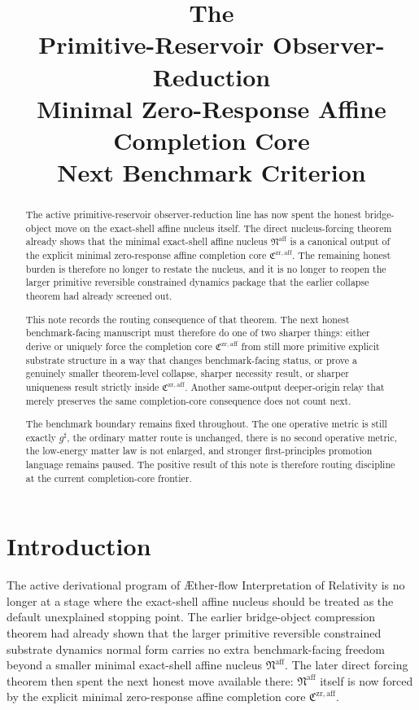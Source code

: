 \documentclass[11pt]{article}
\title{\textbf{The \TheoryName{}}\\[0.4em]
\large Primitive-Reservoir Observer-Reduction\\
\large Minimal Zero-Response Affine Completion Core\\
\large Next Benchmark Criterion}
\author{}
\date{}
\newcommand{\Aflow}{\AE{}ther-flow}
\newcommand{\TheoryName}{\Aflow{} Interpretation of Relativity}
\newcommand{\CompletedMetric}{g^{\sharp}}
\newcommand{\CompletionCore}{\mathfrak C^{\mathrm{zr,aff}}}
\newcommand{\AffineNucleus}{\mathfrak N^{\mathrm{aff}}}
\begin{document}
\maketitle

\begin{abstract}
The active primitive-reservoir observer-reduction line has now spent the honest bridge-object move on the exact-shell affine nucleus itself. The direct nucleus-forcing theorem already shows that the minimal exact-shell affine nucleus \(\AffineNucleus\) is a canonical output of the explicit minimal zero-response affine completion core \(\CompletionCore\). The remaining honest burden is therefore no longer to restate the nucleus, and it is no longer to reopen the larger primitive reversible constrained dynamics package that the earlier collapse theorem had already screened out.

This note records the routing consequence of that theorem. The next honest benchmark-facing manuscript must therefore do one of two sharper things: either derive or uniquely force the completion core \(\CompletionCore\) from still more primitive explicit substrate structure in a way that changes benchmark-facing status, or prove a genuinely smaller theorem-level collapse, sharper necessity result, or sharper uniqueness result strictly inside \(\CompletionCore\). Another same-output deeper-origin relay that merely preserves the same completion-core consequence does not count next.

The benchmark boundary remains fixed throughout. The one operative metric is still exactly \(\CompletedMetric\), the ordinary matter route is unchanged, there is no second operative metric, the low-energy matter law is not enlarged, and stronger first-principles promotion language remains paused. The positive result of this note is therefore routing discipline at the current completion-core frontier.
\end{abstract}

\section{Introduction}

The active derivational program of \TheoryName{} is no longer at a stage where the exact-shell affine nucleus should be treated as the default unexplained stopping point. The earlier bridge-object compression theorem had already shown that the larger primitive reversible constrained substrate dynamics normal form carries no extra benchmark-facing freedom beyond a smaller minimal exact-shell affine nucleus \(\AffineNucleus\). The later direct forcing theorem then spent the next honest move available there: \(\AffineNucleus\) itself is now forced by the explicit minimal zero-response affine completion core \(\CompletionCore\).
\end{document}
